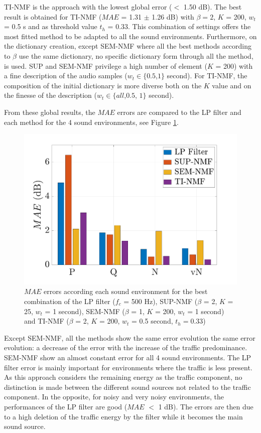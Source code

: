 \documentclass[review,5p,twocolumn,sort&compress,times]{elsarticle}
\begin{document}
TI-NMF is the approach with the lowest global error ($<$ 1.50 dB). The best result is obtained for TI-NMF ($MAE$ = 1.31 $\pm$ 1.26 dB) with $\beta = 2$, $K$ = 200, $w_t$ = 0.5 s and as threshold value $t_h$ = 0.33. This combination of settings offers the most fitted method to be adapted to all the sound environments. 
Furthermore, on the dictionary creation, except SEM-NMF where all the best methods according to $\beta$ use the same dictionary, no specific dictionary form through all the method, is used. SUP and SEM-NMF privilege a high number of element ($K$ = 200) with a fine description of the audio samples ($w_t \in \lbrace 0.5$,$1 \rbrace$ second). For TI-NMF, the composition of the initial dictionary is more diverse both on the $K$ value and on the finesse  of the description ($w_t \in \lbrace all$,$0.5$, $1 \rbrace$ second). 

From these global results, the $MAE$ errors are compared to the LP filter and each method for the 4 sound environments, see Figure \ref{fig:mae_env}. 

\begin{figure}[t]
\centering
\includegraphics[width=\linewidth]{figures/mea_grafic_bar.pdf}
\caption{$MAE$ errors according each sound environment for the best combination of the LP filter ($f_c$ = 500 Hz), SUP-NMF ($\beta$ = 2, $K$ = 25, $w_t$ = 1 second), SEM-NMF ($\beta$ = 1, $K$ = 200, $w_t$ = 1 second) and TI-NMF ($\beta$ = 2, $K$ = 200, $w_t$ = 0.5 second, $t_{h} = 0.33$)}
\label{fig:mae_env}
\end{figure}

Except SEM-NMF, all the methods show the same error evolution the same error evolution: a decrease of the error with the increase of the traffic predominance. SEM-NMF show an almost constant error for all 4 sound environments. The LP filter error is mainly important for environments where the traffic is less present. As this approach considers the remaining energy as the traffic component, no distinction is made between the different sound sources not related to the traffic component. In the opposite, for noisy and very noisy environments, the performances of the LP filter are good ($MAE$ $<$ 1 dB). The errors are then due to a high deletion of the traffic energy by the filter while it becomes the main sound source. 
\end{document}
